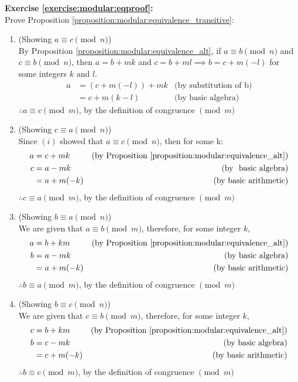 \noindent\textbf{Exercise \ref{exercise:modular:eqproof}:}\\ %
Prove Proposition \ref{proposition:modular:equivalence_transitive}:
\begin{enumerate}
\item 
(Showing $a \equiv c \pmod{n}$)\\
By Proposition \ref{proposition:modular:equivalence_alt}, if $a \equiv b \pmod{n}$ and $c \equiv b \pmod{n}$, then $a = b + mk$ and $c = b + ml \implies b = c + m(-l)$ for some integers $k$ and $l$.
		\begin{align*}
		a&= (c + m(-l)) + mk &\text{(by substitution of b)}\\
		&= c + m(k-l) &\text{(by basic algebra)}
		\end{align*}
$\therefore a \equiv c \pmod{m}$, by the definition of congruence $\pmod{m}$
            
\item
(Showing $c \equiv a \pmod{n}$)\\
Since $(i)$ showed that $a \equiv c \pmod{n}$, then for some k:
		\begin{align*}
		a&= c + mk &\text{(by Proposition \ref{proposition:modular:equivalence_alt})}\\
		c&= a - mk &\text{(by~ basic algebra)}\\
		&= a + m(-k) &\text{(by basic arithmetic)}
		\end{align*}
$\therefore c \equiv a \pmod{m}$, by the definition of congruence $\pmod{m}$\\
            
\item
(Showing $b \equiv a \pmod{n}$)\\
We are given that $a \equiv b \pmod{m}$, therefore, for some integer $k$,
		\begin{align*}
		a&= b + km &\text{(by Proposition \ref{proposition:modular:equivalence_alt})}\\
		b&= a - mk &\text{(by basic algebra)}\\
		&= a + m(-k) &\text{(by basic arithmetic)}
		\end{align*}
$\therefore b \equiv a \pmod{m}$, by the definition of congruence $\pmod{m}$\\
            
\item
(Showing $b \equiv c \pmod{n}$)\\
We are given that $c \equiv b \pmod{m}$, therefore, for some integer $k$,
		\begin{align*}
		c&= b + km &\text{(by Proposition \ref{proposition:modular:equivalence_alt})}\\
		b&= c - mk &\text{(by basic algebra)}\\
		&= c + m(-k) &\text{(by basic arithmetic)}
		\end{align*}
$\therefore b \equiv c \pmod{m}$, by the definition of congruence $\pmod{m}$\\
\end{enumerate}

